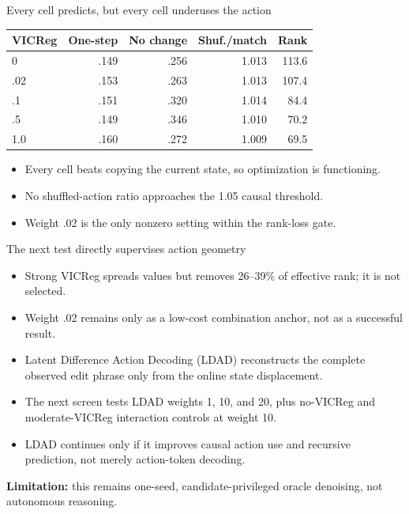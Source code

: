 \documentclass[aspectratio=169]{beamer}
\begin{document}
\begin{frame}{Every cell predicts, but every cell underuses the action}
  \centering
  \begin{tabular}{lrrrr}
    \toprule
    VICReg & One-step & No change & Shuf./match & Rank \\
    \midrule
    0 & .149 & .256 & 1.013 & 113.6 \\
    .02 & .153 & .263 & 1.013 & 107.4 \\
    .1 & .151 & .320 & 1.014 & 84.4 \\
    .5 & .149 & .346 & 1.010 & 70.2 \\
    1.0 & .160 & .272 & 1.009 & 69.5 \\
    \bottomrule
  \end{tabular}
  \vfill
  \begin{itemize}
    \item Every cell beats copying the current state, so optimization is functioning.
    \item No shuffled-action ratio approaches the 1.05 causal threshold.
    \item Weight .02 is the only nonzero setting within the rank-loss gate.
  \end{itemize}
\end{frame}

\begin{frame}{The next test directly supervises action geometry}
  \begin{itemize}
    \item Strong VICReg spreads values but removes 26--39\% of effective rank; it is not selected.
    \item Weight .02 remains only as a low-cost combination anchor, not as a successful result.
    \item Latent Difference Action Decoding (LDAD) reconstructs the complete observed edit phrase only from the online state displacement.
    \item The next screen tests LDAD weights 1, 10, and 20, plus no-VICReg and moderate-VICReg interaction controls at weight 10.
    \item LDAD continues only if it improves causal action use and recursive prediction, not merely action-token decoding.
  \end{itemize}
  \vfill
  \textbf{Limitation:} this remains one-seed, candidate-privileged oracle denoising, not autonomous reasoning.
\end{frame}
\end{document}
